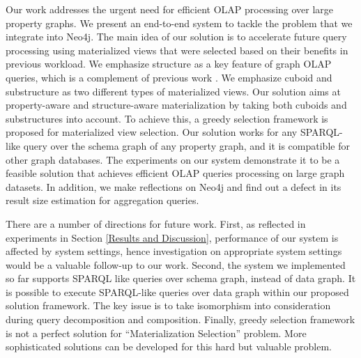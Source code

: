 Our work addresses the urgent need for efficient OLAP processing over large property graphs.  We present an end-to-end system to tackle the problem that we integrate into Neo4j. The main idea of our solution is to accelerate future query processing using materialized views that were selected based on their benefits in previous workload. We emphasize structure as a key feature of graph OLAP queries, which is a complement of previous work \cite{DBLP:conf/sigmod/ZhaoLXH11}. We emphasize cuboid and substructure as two different types of materialized views. Our solution aims at property-aware and structure-aware materialization by taking both cuboids and substructures into account. To achieve this, a greedy selection framework is proposed for materialized view selection. Our solution works for any SPARQL-like query over the schema graph of any property graph, and it is compatible for other graph databases. The experiments on our system demonstrate it to be a feasible solution that achieves efficient OLAP queries processing on large graph datasets.  In addition, we make reflections on Neo4j and find out a defect in its result size estimation for aggregation queries.    

There are a number of directions for future work. First, as reflected in experiments in Section \ref{Results and Discussion}, performance of our system is affected by system settings, hence investigation on appropriate system settings would be a valuable follow-up to our work. Second, the system we implemented so far supports SPARQL like queries over schema graph, instead of data graph. It is possible to execute SPARQL-like queries over data graph within our proposed solution framework. The key issue is to take isomorphism into consideration during query decomposition and composition. Finally, greedy selection framework is not a perfect solution for ``Materialization Selection'' problem. More sophisticated solutions can be developed for this hard but valuable problem.


